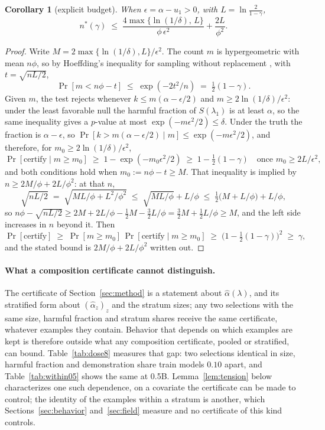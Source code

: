 \documentclass{article} %
\newtheorem{corollary}{Corollary}
\newcommand{\sel}[1]{S(#1)}
\newcommand{\ahat}{\hat\alpha}
\begin{document}
\begin{corollary}[explicit budget]
\label{cor:budget}
When $\epsilon = \alpha - u_1 > 0$, with $L = \ln\frac{2}{1-\gamma}$,
\[
n^{*}(\gamma) \;\le\; \frac{4 \max\{\ln(1/\delta),\, L\}}{\phi\,\epsilon^{2}} + \frac{2 L}{\phi^{2}} .
\]
\end{corollary}
\begin{proof}
Write $M = 2\max\{\ln(1/\delta), L\}/\epsilon^2$. The count $m$ is hypergeometric with mean $n\phi$, so by Hoeffding's inequality for sampling without replacement \citep{hoeffding1963probability}, with $t = \sqrt{nL/2}$,
\[
\Pr[m < n\phi - t] \;\le\; \exp(-2t^2/n) \;=\; \tfrac{1}{2}(1 - \gamma).
\]
Given $m$, the test rejects whenever $k \le m(\alpha - \epsilon/2)$ and $m \ge 2\ln(1/\delta)/\epsilon^2$: under the least favorable null the harmful fraction of $\sel{\lambda_1}$ is at least $\alpha$, so the same inequality gives a $p$-value at most $\exp(-m\epsilon^2/2) \le \delta$. Under the truth the fraction is $\alpha - \epsilon$, so $\Pr[k > m(\alpha - \epsilon/2) \mid m] \le \exp(-m\epsilon^2/2)$, and therefore, for $m_0 \ge 2\ln(1/\delta)/\epsilon^2$,
\[
\Pr[\text{certify} \mid m \ge m_0] \;\ge\; 1 - \exp(-m_0 \epsilon^2 / 2) \;\ge\; 1 - \tfrac{1}{2}(1 - \gamma) \quad \text{once } m_0 \ge 2L/\epsilon^2,
\]
and both conditions hold when $m_0 := n\phi - t \ge M$. That inequality is implied by $n \ge 2M/\phi + 2L/\phi^2$: at that $n$,
\[
\sqrt{nL/2} \;=\; \sqrt{ML/\phi + L^2/\phi^2} \;\le\; \sqrt{ML/\phi} + L/\phi \;\le\; \tfrac{1}{2}\big(M + L/\phi\big) + L/\phi,
\]
so $n\phi - \sqrt{nL/2} \ge 2M + 2L/\phi - \tfrac{1}{2}M - \tfrac{3}{2}L/\phi = \tfrac{3}{2}M + \tfrac{1}{2}L/\phi \ge M$, and the left side increases in $n$ beyond it. Then
\[
\Pr[\text{certify}] \;\ge\; \Pr[m \ge m_0]\,\Pr[\text{certify} \mid m \ge m_0] \;\ge\; \big(1 - \tfrac{1}{2}(1-\gamma)\big)^2 \;\ge\; \gamma,
\]
and the stated bound is $2M/\phi + 2L/\phi^2$ written out.
\end{proof}

\paragraph{What a composition certificate cannot distinguish.} The certificate of Section~\ref{sec:method} is a statement about $\ahat(\lambda)$, and its stratified form about $(\ahat_z)_z$ and the stratum sizes; any two selections with the same size, harmful fraction and stratum shares receive the same certificate, whatever examples they contain. Behavior that depends on which examples are kept is therefore outside what any composition certificate, pooled or stratified, can bound. Table~\ref{tab:dose8} measures that gap: two selections identical in size, harmful fraction and demonstration share train models $0.10$ apart, and Table~\ref{tab:within05} shows the same at 0.5B. Lemma~\ref{lem:tension} below characterizes one such dependence, on a covariate the certificate can be made to control; the identity of the examples within a stratum is another, which Sections~\ref{sec:behavior} and~\ref{sec:field} measure and no certificate of this kind controls.
\end{document}
